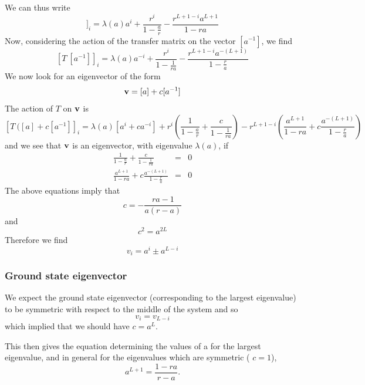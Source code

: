 We can thus write
\begin{equation}
[T\ [a]]_i= \lambda(a)a^i +\frac{r^i}{1-\frac{a}{r}}-\frac{r^{L+1-i}a^{L+1}}{1-ra}
\end{equation}
Now, considering the action of the transfer matrix on the vector $[a^{-1}]$, we find
\begin{equation}
\left[T\ [a^{-1}]\right]_i = \lambda(a) a^{-i} + \frac{r^i}{1-\frac{1}{ra}}-\frac{r^{L+1-i}a^{-(L+1)}}{1-\frac{r}{a}}
\end{equation}
We now look for an eigenvector of the form
\begin{equation}
{\bf v} = [a]+ c[a^{-1}]
\end{equation}
The action of $T$ on ${\bf v}$ is 
\begin{equation}
\left[T\ ([a]+c [a^{-1}]\right]_i = \lambda(a)[a^i + c a^{-i}]
+ r^i\left(\frac{1}{1-\frac{a}{r}}+ \frac{c}{1-\frac{1}{ra}}\right)
- r^{L+1-i} \left(\frac{a^{L+1}}{1-ra} + c\frac{a^{-(L+1)}}{1-\frac{r}{a}}\right)
\end{equation}
and we see that ${\bf v}$ is an eigenvector, with eigenvalue $\lambda(a)$, if
\begin{eqnarray}
\frac{1}{1-\frac{a}{r}}+ \frac{c}{1-\frac{1}{ra}}&=&0 \\
\frac{a^{L+1}}{1-ra} + c\frac{a^{-(L+1)}}{1-\frac{r}{a}} &=& 0
\end{eqnarray}
The above equations imply that 
\begin{equation}
c= -\frac{ra-1}{a(r-a)}
\end{equation}
and
\begin{equation}
c^2 = a^{2L}
\end{equation}
Therefore we find
\begin{equation}
v_i = a^i \pm a^{L-i}
\end{equation}

\subsubsection*{Ground state eigenvector}
We expect the ground state eigenvector (corresponding to the largest eigenvalue) to be symmetric with respect to the middle of the system and so 
\begin{equation}
v_i= v_{L-i}
\end{equation}
which implied that we should have $c= a^L$. 

This then gives the equation determining the values of a for the largest eigenvalue, and in general for the eigenvalues which are symmetric ( $c=1$),
\begin{equation}
a^{L+1} = \frac{1-ra}{r-a}.
\label{aeq}
\end{equation}

